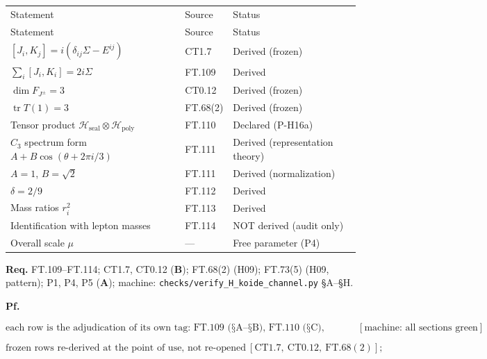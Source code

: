 \documentclass[11pt,openany]{report}
\theoremstyle{canonplain}
\theoremstyle{canondef}
\begin{document}
{\setlength{\tabcolsep}{4pt}
\begin{longtable}{>{\raggedright\arraybackslash}p{}|>{\raggedright\arraybackslash}p{}|>{\raggedright\arraybackslash}p{}}
\toprule
Statement & Source & Status \\
\addlinespace[2pt]
\midrule
\endfirsthead
\toprule
Statement & Source & Status \\
\addlinespace[2pt]
\midrule
\endhead
\bottomrule
\endlastfoot
$[J_i,\allowbreak K_j]=\allowbreak i(\delta_{ij}\Sigma-E^{ij})$ & CT1.7 & Derived (frozen) \\
$\sum_i[J_i,\allowbreak K_i]=\allowbreak 2i\Sigma$ & FT.109 & Derived \\
$\dim F_{J^\pm}=\allowbreak 3$ & CT0.12 & Derived (frozen) \\
$\operatorname{tr}T(1)=\allowbreak 3$ & FT.68(2) & Derived (frozen) \\
Tensor product $\mathcal H_{\mathrm{seal}}\otimes\mathcal H_{\mathrm{poly}}$ & FT.110 & Declared (P-H16a) \\
$C_3$ spectrum form $A+\allowbreak B\cos(\theta+\allowbreak 2\pi i/3)$ & FT.111 & Derived (representation theory) \\
$A=\allowbreak 1$, $B=\allowbreak \sqrt2$ & FT.111 & Derived (normalization) \\
$\delta=\allowbreak 2/9$ & FT.112 & Derived \\
Mass ratios $r_i^2$ & FT.113 & Derived \\
Identification with lepton masses & FT.114 & NOT derived (audit only) \\
Overall scale $\mu$ & — & Free parameter (P4) \\
\end{longtable}
}

\textbf{Req.} FT.109–FT.114; CT1.7, CT0.12 (\textbf{B}); FT.68(2) (H09); FT.73(5) (H09, pattern); P1, P4, P5 (\textbf{A}); machine: \texttt{checks/\allowbreak{}verify\_\allowbreak{}H\_\allowbreak{}koide\_\allowbreak{}channel.py} §A–§H.

\textbf{Pf.}

\[
\text{each row is the adjudication of its own tag: FT.109 (§A–§B), FT.110 (§C), FT.111 (§D), FT.112 (§E), FT.113 (§F), FT.114 (§G–§H)}\ [\text{machine: all sections green}]
\]

\[
\text{frozen rows re-derived at the point of use, not re-opened}\ [\mathrm{CT1.7},\ \mathrm{CT0.12},\ \mathrm{FT.68}(2)];
\]
\end{document}
